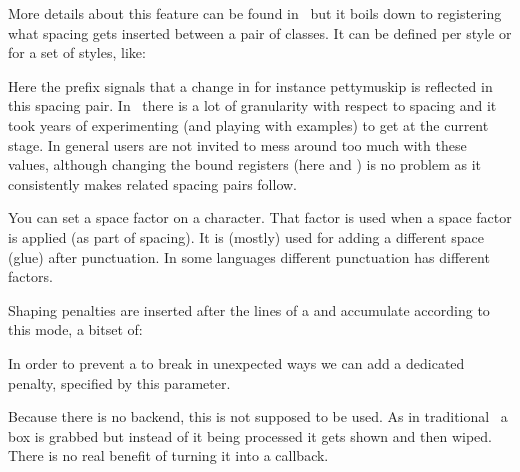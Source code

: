 More details about this feature can be found in \CONTEXT\ but it boils down to
registering what spacing gets inserted between a pair of classes. It can be
defined per style or for a set of styles, like:

\starttyping
\inherited\setmathspacing
  \mathimplicationcode \mathbinarycode
  \alldisplaystyles \thickermuskip
\inherited\setmathspacing
  \mathradicalcode \mathmiddlecode
  \allunsplitstyles \pettymuskip
\stoptyping

Here the  prefix signals that a change in for instance \prm
{pettymuskip} is reflected in this spacing pair. In \CONTEXT\ there is a lot of
granularity with respect to spacing and it took years of experimenting (and
playing with examples) to get at the current stage. In general users are not
invited to mess around too much with these values, although changing the bound
registers (here  and ) is no problem as it
consistently makes related spacing pairs follow.

\stopnewprimitive

\startoldprimitive[title={\prm {sfcode}}]

You can set a space factor on a character. That factor is used when a space
factor is applied (as part of spacing). It is (mostly) used for adding a
different space (glue) after punctuation. In some languages different punctuation
has different factors.

\stopoldprimitive

\startnewprimitive[title={\prm {shapingpenaltiesmode}}]

Shaping penalties are inserted after the lines of a  and
accumulate according to this mode, a bitset of:


\stopnewprimitive

\startnewprimitive[title={\prm {shapingpenalty}}]

In order to prevent a  to break in unexpected ways we can add a
dedicated penalty, specified by this parameter.

\stopnewprimitive

\startoldprimitive[title={\prm {shipout}}][obsolete=yes]

Because there is no backend, this is not supposed to be used. As in traditional
\TEX\ a box is grabbed but instead of it being processed it gets shown and then
wiped. There is no real benefit of turning it into a callback.

